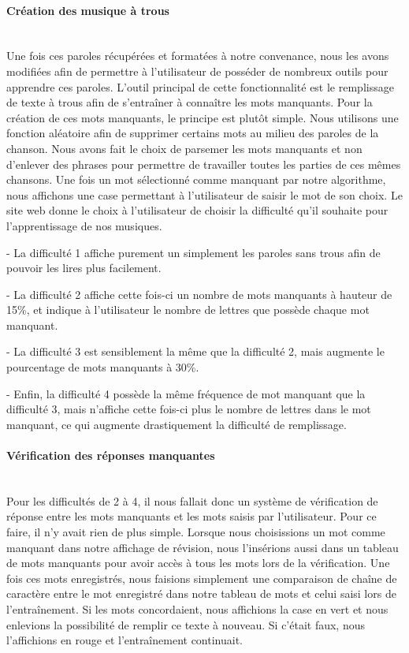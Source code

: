 \documentclass[12pt,french]{article}
\begin{document}
\paragraph{Création des musique à trous \\\\}

Une fois ces paroles récupérées et formatées à notre convenance, nous les avons modifiées afin de permettre à l'utilisateur de posséder de nombreux outils pour apprendre ces paroles. L'outil principal de cette fonctionnalité est le remplissage de texte à trous afin de s'entraîner à connaître les mots manquants. Pour la création de ces mots manquants, le principe est plutôt simple. Nous utilisons une fonction aléatoire afin de supprimer certains mots au milieu des paroles de la chanson. Nous avons fait le choix de parsemer les mots manquants et non d'enlever des phrases pour permettre de travailler toutes les parties de ces mêmes chansons. Une fois un mot sélectionné comme manquant par notre algorithme, nous affichons une case permettant à l'utilisateur de saisir le mot de son choix. Le site web donne le choix à l'utilisateur de choisir la difficulté qu'il souhaite pour l'apprentissage de nos musiques.
\newline

- La difficulté 1 affiche purement un simplement les paroles sans trous afin de pouvoir les lires plus facilement. 

- La difficulté 2 affiche cette fois-ci un nombre de mots manquants à hauteur de 15\%, et indique à l'utilisateur le nombre de lettres que possède chaque mot manquant.

- La difficulté 3 est sensiblement la même que la difficulté 2, mais augmente le pourcentage de mots manquants à 30\%.

- Enfin, la difficulté 4 possède la même fréquence de mot manquant que la difficulté 3, mais n'affiche cette fois-ci plus le nombre de lettres dans le mot manquant, ce qui augmente drastiquement la difficulté de remplissage.  
     
\paragraph{Vérification des réponses manquantes \\\\}

Pour les difficultés de 2 à 4, il nous fallait donc un système de vérification de réponse entre les mots manquants et les mots saisis par l'utilisateur. Pour ce faire, il n'y avait rien de plus simple. Lorsque nous choisissions un mot comme manquant dans notre affichage de révision, nous l'insérions aussi dans un tableau de mots manquants pour avoir accès à tous les mots lors de la vérification. Une fois ces mots enregistrés, nous faisions simplement une comparaison de chaîne de caractère entre le mot enregistré dans notre tableau de mots et celui saisi lors de l'entraînement. Si les mots concordaient, nous affichions la case en vert et nous enlevions la possibilité de remplir ce texte à nouveau. Si c'était faux, nous l'affichions en rouge et l'entraînement continuait.
\end{document}

